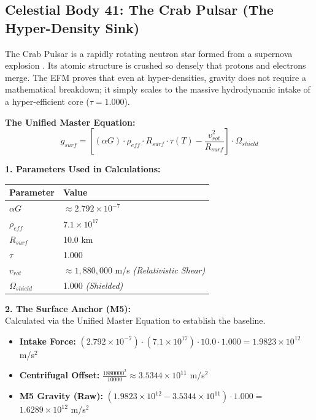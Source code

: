 \documentclass[11pt, a4paper]{article}
\begin{document}
\clearpage
\subsection{Celestial Body 41: The Crab Pulsar (The Hyper-Density Sink)}
  The Crab Pulsar is a rapidly rotating neutron star formed from a supernova explosion \cite{hester2008}. Its atomic structure is crushed so densely that protons and electrons merge. The EFM proves that even at hyper-densities, gravity does not require a mathematical breakdown; it simply scales to the massive hydrodynamic intake of a hyper-efficient core ($\tau = 1.000$).

  \vspace{0.5em}
  \noindent \textbf{The Unified Master Equation:}
  $$ g_{surf} = \left[ (\alpha G) \cdot \rho_{eff} \cdot R_{surf} \cdot \tau(T) - \frac{v_{rot}^2}{R_{surf}} \right] \cdot \Omega_{shield} $$

  \vspace{0.5em}
  \noindent \textbf{1. Parameters Used in Calculations:} \\[0.5em]
  \begingroup
  \renewcommand{\arraystretch}{1.3}
  \hspace*{2em}
  \begin{tabular}{|l|l|}
    \hline
    \textbf{Parameter} & \textbf{Value} \\ \hline
    $\alpha G$ & $\approx 2.792 \times 10^{-7}$ \\ \hline
    $\rho_{eff}$ & $7.1 \times 10^{17}$ \\ \hline
    $R_{surf}$ & 10.0 km \\ \hline
    $\tau$ & 1.000 \\ \hline
    $v_{rot}$ & $\approx 1,880,000$ m/s \textit{(Relativistic Shear)} \\ \hline
    $\Omega_{shield}$ & 1.000 \textit{(Shielded)} \\ \hline
  \end{tabular}
  \endgroup

  \vspace{1.0em}
  \noindent \textbf{2. The Surface Anchor (M5):} \\
  \hspace*{1em} Calculated via the Unified Master Equation to establish the baseline.
  \begin{itemize}
    \item \textbf{Intake Force:} $(2.792 \times 10^{-7}) \cdot (7.1 \times 10^{17}) \cdot 10.0 \cdot 1.000 = 1.9823 \times 10^{12}$ m/s$^2$
    \item \textbf{Centrifugal Offset:} $\frac{1880000^2}{10000} \approx 3.5344 \times 10^{11}$ m/s$^2$
    \item \textbf{M5 Gravity (Raw):} $(1.9823 \times 10^{12} - 3.5344 \times 10^{11}) \cdot 1.000 =$ \textbf{$1.6289 \times 10^{12}$} m/s$^2$
  \end{itemize}
\end{document}
